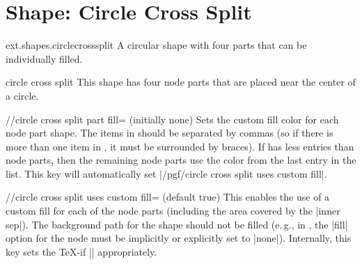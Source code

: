 %
%
%
\section{Shape: Circle Cross Split}
\begin{pgflibrary}{ext.shapes.circlecrosssplit}
  A circular shape with four parts that can be individually filled.
\end{pgflibrary}
\begin{ext_shape}{circle cross split}
This shape has four node parts that are placed near the center of a circle.

\begin{key}{/\pgfext/circle cross split part fill= (initially none)}
Sets the custom fill color for each node part shape.
The items in  should be separated by commas
(so if there is more than one item in , it must be surrounded by braces).
If  has less entries than node parts,
then the remaining node parts use the color from the last entry in the list.
This key will automatically set |/pgf/circle cross split uses custom fill|.
\end{key}
\begin{key}{/\pgfext/circle cross split uses custom fill= (default true)}
This enables the use of a custom fill for each of the node parts
(including the area covered by the |inner sep|).
The background path for the shape should not be filled (e.\,g., in \tikzname,
the |fill| option for the node must be implicitly or explicitly set to |none|).
Internally, this key sets the \TeX-if |\ifextpgfcirclecrosssplitcustomfill| appropriately. 
\end{key}
\begin{codeexample}[preamble=\usepgflibrary{ext.shapes.circlecrosssplit}]
\end{codeexample}
\end{ext_shape}
\endinput